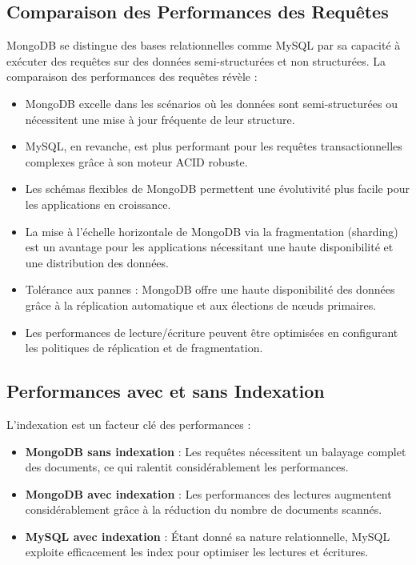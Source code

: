 \documentclass[12pt,a4paper]{report}
\begin{document}
    \subsection{Comparaison des Performances des Requêtes}
        \begin{card}
            MongoDB se distingue des bases relationnelles comme MySQL par sa capacité à exécuter des requêtes sur des données semi-structurées et non structurées. 
            La comparaison des performances des requêtes révèle :
            \begin{itemize}
                \item MongoDB excelle dans les scénarios où les données sont semi-structurées ou nécessitent une mise à jour fréquente de leur structure.
                \item MySQL, en revanche, est plus performant pour les requêtes transactionnelles complexes grâce à son moteur ACID robuste.
                \item Les schémas flexibles de MongoDB permettent une évolutivité plus facile pour les applications en croissance.
                \item La mise à l'échelle horizontale de MongoDB via la fragmentation (sharding) est un avantage pour les applications nécessitant une haute disponibilité et une distribution des données.
                \item Tolérance aux pannes : MongoDB offre une haute disponibilité des données grâce à la réplication automatique et aux élections de nœuds primaires.
                \item Les performances de lecture/écriture peuvent être optimisées en configurant les politiques de réplication et de fragmentation.
            \end{itemize}
        \end{card}

    \subsection{Performances avec et sans Indexation}

        \begin{card}
            L'indexation est un facteur clé des performances :
            \begin{itemize}
                \item \textbf{MongoDB sans indexation} : Les requêtes nécessitent un balayage complet des documents, ce qui ralentit considérablement les performances.
                \item \textbf{MongoDB avec indexation} : Les performances des lectures augmentent considérablement grâce à la réduction du nombre de documents scannés.
                \item \textbf{MySQL avec indexation} : Étant donné sa nature relationnelle, MySQL exploite efficacement les index pour optimiser les lectures et écritures.
            \end{itemize}
        \end{card}
\end{document}
